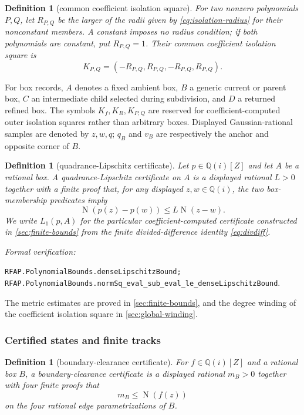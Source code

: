 \documentclass[11pt]{article}
\newtheorem{definition}[theorem]{Definition}
\newcommand{\Qi}{\mathbb{Q}(i)}
\newcommand{\Norm}[1]{\operatorname{N}\!\left(#1\right)}
\newcommand{\leanref}[1]{\par\smallskip\noindent
  \emph{Formal verification:}\par\nobreak
  {\raggedright\nolinkurl{#1}.\par}}
\begin{document}
\begin{definition}[common coefficient isolation square]
\label{def:common-coefficient-isolation-square}
For two nonzero polynomials $P,Q$, let $R_{P,Q}$ be the larger of the radii
given by \eqref{eq:isolation-radius} for their nonconstant members.  A
constant imposes no radius condition; if both polynomials are constant, put
$R_{P,Q}=1$.  Their
\emph{common coefficient isolation square} is
\[
 K_{P,Q}=(-R_{P,Q},R_{P,Q},-R_{P,Q},R_{P,Q}).
\]
\end{definition}

For box records, $A$ denotes a fixed ambient box, $B$ a generic current or
parent box, $C$ an intermediate child selected during subdivision, and $D$
a returned refined box.  The symbols $K_f,K_R,K_{P,Q}$ are reserved for
coefficient-computed outer isolation squares rather than arbitrary boxes.
Displayed Gaussian-rational samples are denoted by $z,w,q$; $q_B$ and $v_B$
are respectively the anchor and opposite corner of $B$.

\begin{definition}[quadrance-Lipschitz certificate]
\label{def:quadrance-lipschitz}
Let $p\in\Qi[Z]$ and let $A$ be a rational box.  A
\emph{quadrance-Lipschitz certificate} on $A$ is a displayed rational
$L>0$ together with a finite proof that, for any displayed $z,w\in\Qi$,
the two box-membership predicates imply
\begin{equation}
\label{eq:quadrance-lipschitz}
             \Norm{p(z)-p(w)}\le L\Norm{z-w}.
\end{equation}
We write $L_1(p,A)$ for the particular coefficient-computed certificate
constructed in \cref{sec:finite-bounds} from the finite divided-difference
identity \eqref{eq:divdiff}.
\end{definition}

\leanref{RFAP.PolynomialBounds.denseLipschitzBound;
RFAP.PolynomialBounds.normSq_eval_sub_eval_le_denseLipschitzBound}

The metric estimates are proved in \cref{sec:finite-bounds}, and the degree
winding of the coefficient isolation square in \cref{sec:global-winding}.

\subsubsection{Certified states and finite tracks}

\begin{definition}[boundary-clearance certificate]
\label{def:boundary-clearance}
For $f\in\Qi[Z]$ and a rational box $B$, a
\emph{boundary-clearance certificate} is a displayed rational $m_B>0$
together with four finite proofs that
\[
                 m_B\le\Norm{f(z)}
\]
on the four rational edge parametrizations of $B$.
\end{definition}
\end{document}
